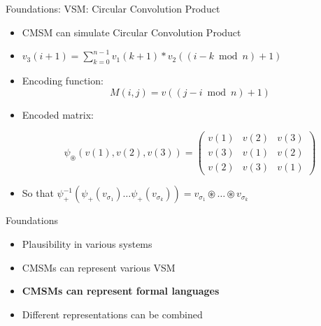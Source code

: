 \documentclass[12pt,a4paper]{beamer}
\begin{document}
\begin{frame}{Foundations: VSM: Circular Convolution Product}
\begin{itemize}
\item CMSM can simulate Circular Convolution Product 
\item $v_{3}(i+1) = \sum_{k=0}^{n-1}{v_{1} (k+1) * v_{2} ( (i-k \bmod{n}) +1) }$
\item Encoding function:
$$  M(i,j) = v ((j - i \bmod{n} ) +1) $$
\item Encoded matrix:

$$\psi_{ \circledast } ( v(1), v(2), v(3) ) =
\left( \begin{array}{ccc}
v(1) & v(2) & v(3)  \\
v(3) & v(1) & v(2)  \\
v(2) & v(3) & v(1)  \end{array} \right)
$$

\item So that $\psi_{+}^{-1} (\psi_{+}(v_{\sigma_{1}}) \ldots \psi_{+}(v_{\sigma_{k}})) = v_{\sigma_{1}} \circledast \ldots \circledast v_{\sigma_{k}}$

\end{itemize}
\end{frame}





\begin{frame}{Foundations}
\begin{itemize}
\item Plausibility in various systems
\item CMSMs can represent various VSM
\item \textbf{CMSMs can represent formal languages}
\item Different representations can be combined
\end{itemize}
\end{frame}
\end{document}
